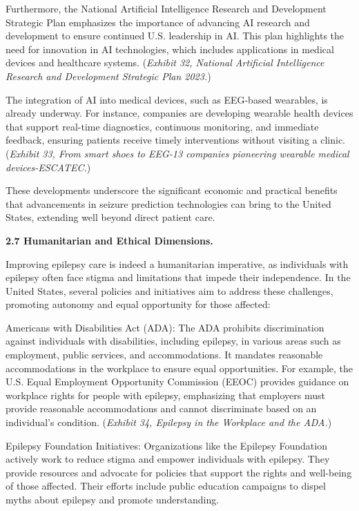 \documentclass{article}
\begin{document}
Furthermore, the National Artificial Intelligence Research and Development Strategic Plan emphasizes the importance of advancing AI research and development to ensure continued U.S. leadership in AI. This plan highlights the need for innovation in AI technologies, which includes applications in medical devices and healthcare systems. ({\it Exhibit 32, National Artificial Intelligence Research and Development Strategic Plan 2023.})

The integration of AI into medical devices, such as EEG-based wearables, is already underway. For instance, companies are developing wearable health devices that support real-time diagnostics, continuous monitoring, and immediate feedback, ensuring patients receive timely interventions without visiting a clinic. ({\it Exhibit 33, From smart shoes to EEG-13 companies pioneering wearable medical devices-ESCATEC.})

These developments underscore the significant economic and practical benefits that advancements in seizure prediction technologies can bring to the United States, extending well beyond direct patient care.

{\bf 2.7 Humanitarian and Ethical Dimensions. }

Improving epilepsy care is indeed a humanitarian imperative, as individuals with epilepsy often face stigma and limitations that impede their independence. In the United States, several policies and initiatives aim to address these challenges, promoting autonomy and equal opportunity for those affected:

Americans with Disabilities Act (ADA): The ADA prohibits discrimination against individuals with disabilities, including epilepsy, in various areas such as employment, public services, and accommodations. It mandates reasonable accommodations in the workplace to ensure equal opportunities. For example, the U.S. Equal Employment Opportunity Commission (EEOC) provides guidance on workplace rights for people with epilepsy, emphasizing that employers must provide reasonable accommodations and cannot discriminate based on an individual's condition. ({\it Exhibit 34, Epilepsy in the Workplace and the ADA.})

Epilepsy Foundation Initiatives: Organizations like the Epilepsy Foundation actively work to reduce stigma and empower individuals with epilepsy. They provide resources and advocate for policies that support the rights and well-being of those affected. Their efforts include public education campaigns to dispel myths about epilepsy and promote understanding.
\end{document}
